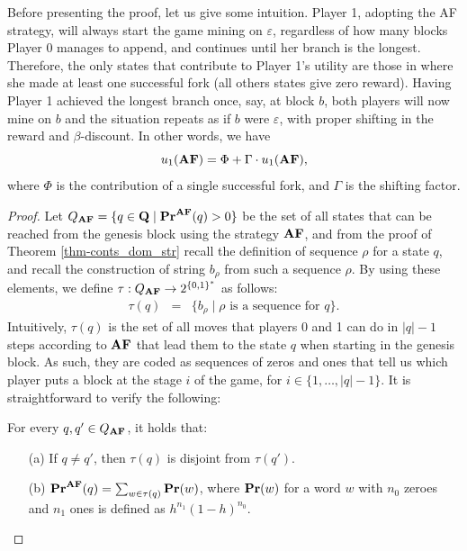 Before presenting the proof, let us give some intuition. Player 1, adopting the AF strategy, will always start the game mining on $\varepsilon$, regardless of how many blocks Player 0 manages to append, and continues until her branch is the longest. Therefore, the only states that contribute to Player 1's utility are those in where she made at least one successful fork (all others states give zero reward). Having Player 1 achieved the longest branch once, say, at block $b$, both players will now mine on $b$ and the situation repeats as if $b$ were $\varepsilon$, with proper shifting in the reward and $\beta$-discount. In other words, we have
$$u_1(\text{\rm {\bf AF}}) = \Phi + \Gamma\cdot u_1(\text{\rm {\bf AF}}),$$
where $\Phi$ is the contribution of a single successful fork, and $\Gamma$ is the shifting factor.

\begin{proof}
Let $Q_{\text{\rm {\bf AF}}} = \{q \in \mathbf{Q} \mid \mathbf{Pr}^{\text{\rm {\bf AF}}}(q) > 0\}$ be the set of all states that can be reached from the genesis block using the strategy $\text{\rm {\bf AF}}$, and from the proof of Theorem \ref{thm-conts_dom_str} recall the definition of sequence $\rho$ for a state $q$, and recall the construction of string $b_\rho$ from such a sequence $\rho$.
By using these elements, we define $\tau:Q_{\text{\rm {\bf AF}}} \to 2^{\{0,1\}^*}$ as follows:
\begin{eqnarray*}
\tau(q) & = & \{ b_\rho \mid \rho \text{ is a sequence for } q\}.
\end{eqnarray*}
Intuitively, $\tau(q)$ is the set of all moves that players 0 and 1 can do in $|q|-1$ steps according to $\text{\rm {\bf AF}}$ that lead them to the state $q$ when starting in the genesis block. As such, they are coded as sequences of zeros and ones that tell us which player puts a block at the stage $i$ of the game, for $i \in \{ 1,\ldots, |q|-1\}$. It is straightforward to verify the following:
\begin{myclaim}\label{claim-words} For every $q, q'\in Q_{\text{\rm {\bf AF}}}$, it holds that:
\begin{itemize}
\item[(a)] If $q\neq q'$, then $\tau(q)$ is disjoint from $\tau(q')$.
\item[(b)] $\mathbf{Pr}^{\text{\rm {\bf AF}}}(q) = \sum_{w \in \tau(q)} \mathbf{Pr}(w)$, where $\mathbf{Pr}(w)$ for a word $w$ with $n_0$ zeroes and $n_1$ ones is  defined as 
$h^{n_1}(1-h)^{n_0}$.
\end{itemize}

\end{myclaim}
\end{proof}
